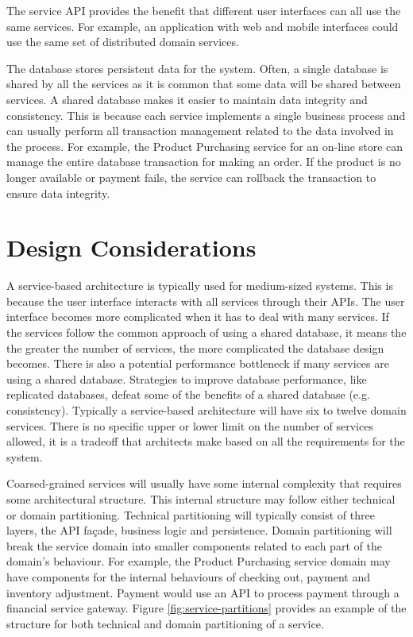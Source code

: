 The service API provides the benefit that different user interfaces can all use the same services.
For example, an application with web and mobile interfaces could use the same set of distributed domain services.

The database stores persistent data for the system.
Often, a single database is shared by all the services as it is common that some data will be shared between services.
A shared database makes it easier to maintain data integrity and consistency.
This is because each service implements a single business process
and can usually perform all transaction management related to the data involved in the process.
For example, the Product Purchasing service for an on-line store can manage the entire database transaction for making an order.
If the product is no longer available or payment fails, the service can rollback the transaction to ensure data integrity.


\section{Design Considerations}\label{sec:design-considerations}

A service-based architecture is typically used for medium-sized systems.
This is because the user interface interacts with all services through their APIs.
The user interface becomes more complicated when it has to deal with many services.
If the services follow the common approach of using a shared database,
it means the the greater the number of services, the more complicated the database design becomes.
There is also a potential performance bottleneck if many services are using a shared database.
Strategies to improve database performance, like replicated databases, defeat some of the benefits of a shared database (e.g. consistency).
Typically a service-based architecture will have six to twelve domain services.
There is no specific upper or lower limit on the number of services allowed,
it is a tradeoff that architects make based on all the requirements for the system.

Coarsed-grained services will usually have some internal complexity that requires some architectural structure.
This internal structure may follow either technical or domain partitioning.
Technical partitioning will typically consist of three layers, the API façade, business logic and persistence.
Domain partitioning will break the service domain into smaller components related to each part of the domain's behaviour.
For example, the Product Purchasing service domain may have components for the internal behaviours of checking out,
payment and inventory adjustment. Payment would use an API to process payment through a financial service gateway.
Figure \ref{fig:service-partitions} provides an example of the structure for both technical and domain partitioning of a service.

